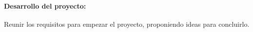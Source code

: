 \documentclass[11pt,a4paper]{article}
\begin{document}
\paragraph{Desarrollo del proyecto:}
Reunir los requisitos para empezar el proyecto, proponiendo ideas para concluirlo.

\newpage

\cite{ruiperez2016diseno,}


\end{document}
